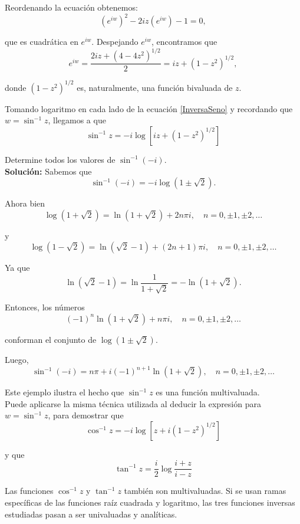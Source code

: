Reordenando la ecuación obtenemos:
$$(e^{iw})^2 - 2iz (e^{iw}) - 1 = 0,$$

que es cuadrática en $e^{iw}$. Despejando $e^{iw}$, encontramos que 
\begin{equation}
e^{iw} = \frac{2iz + (4-4z^2)^{1/2}}{2} =  iz + (1-z^2)^{1/2}, \label{InversaSeno}
\end{equation}

donde $(1-z^2)^{1/2}$ es, naturalmente, una función bivaluada de $z$. 

Tomando logaritmo en cada lado de la ecuación \eqref{InversaSeno} y recordando que $w = \sin^{-1}z$, llegamos a que
$$\boxed{\sin^{-1} z = -i \log [iz + (1-z^2)^{1/2}]}$$

\begin{ejemplo}
Determine todos los valores de $\sin^{-1}(-i)$.
\\

\textbf{Solución:} Sabemos que
$$\sin^{-1}(-i) = -i \log(1 \pm \sqrt{2}).$$

Ahora bien 
$$\log(1 + \sqrt{2}) = \ln(1+\sqrt{2}) + 2n\pi i, \quad n = 0, \pm 1, \pm 2, \dots$$

y
$$\log(1 - \sqrt{2}) = \ln(\sqrt{2}-1) + (2n+1)\pi i, \quad n = 0, \pm 1, \pm 2, \dots$$

Ya que 
$$\ln(\sqrt{2} -1) = \ln \frac{1}{1 + \sqrt{2}} = - \ln (1+\sqrt{2}).$$

Entonces, los números 
$$ (-1)^n \ln(1+\sqrt{2}) + n\pi i, \quad n = 0, \pm1, \pm 2, \dots $$

conforman el conjunto de $\log(1 \pm \sqrt{2})$.

Luego, 
$$\sin^{-1}(-i) = n \pi + i(-1)^{n+1} \ln (1+\sqrt{2}), \quad n = 0, \pm 1, \pm 2,\dots$$

\end{ejemplo}

Este ejemplo ilustra el hecho que $\sin^{-1} z$ es una función multivaluada.
\\

Puede aplicarse la misma técnica utilizada al deducir la expresión para $w = \sin^{-1} z$, para demostrar que 
$$\boxed{\cos^{-1} z = -i \log[z + i(1-z^2)^{1/2}]}$$

y que 
$$\boxed{\tan^{-1} z = \frac{i}{2} \log \frac{i+z}{i-z}}$$

Las funciones $\cos^{-1} z$ y $\tan^{-1}z$ también son multivaluadas. Si se usan ramas específicas de las funciones raíz cuadrada y logaritmo, las tres funciones inversas estudiadas pasan a ser univaluadas y analíticas.

